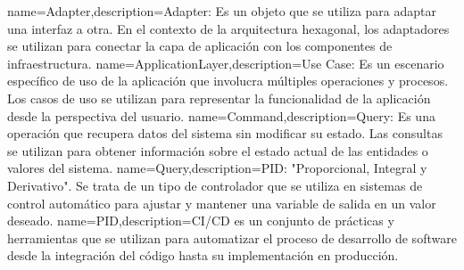  {name={Adapter},description={Adapter: Es un objeto que se utiliza para adaptar una interfaz a otra. En el contexto de la arquitectura hexagonal, los adaptadores se utilizan para conectar la capa de aplicación con los componentes de infraestructura.}}
 {name={ApplicationLayer},description={Use Case: Es un escenario específico de uso de la aplicación que involucra múltiples operaciones y procesos. Los casos de uso se utilizan para representar la funcionalidad de la aplicación desde la perspectiva del usuario.}}
 {name={Command},description={Query: Es una operación que recupera datos del sistema sin modificar su estado. Las consultas se utilizan para obtener información sobre el estado actual de las entidades o valores del sistema.}}
 {name={Query},description={PID: "Proporcional, Integral y Derivativo". Se trata de un tipo de controlador que se utiliza en sistemas de control automático para ajustar y mantener una variable de salida en un valor deseado.}}
 {name={PID},description={CI/CD es un conjunto de prácticas y herramientas que se utilizan para automatizar el proceso de desarrollo de software desde la integración del código hasta su implementación en producción.}}
